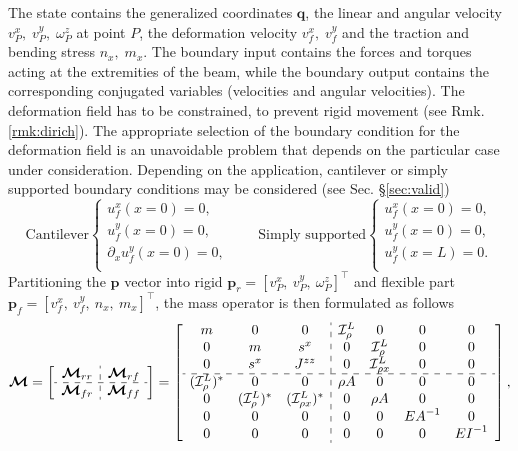 \documentclass{svjour3}                     %
\newcommand{\secref}[1]{\S\ref{#1}}
\begin{document}
The state contains the generalized coordinates $\bm{q}$, the linear and angular velocity $v_P^x, \; v_P^y, \; \omega_P^z$ at point $P$, the deformation velocity $ v_f^x, \; v_f^y$ and the traction and bending stress $n_x, \; m_{x}$. The boundary input contains the forces and torques acting at the extremities of the beam, while the boundary output contains the corresponding conjugated variables (velocities and angular velocities).
The deformation field has to be constrained, to prevent rigid movement (see Rmk. \ref{rmk:dirich}). The appropriate selection of the boundary condition for the deformation field is an unavoidable problem that depends on the particular case under consideration.  Depending on the application, cantilever or simply supported boundary conditions may be considered (see Sec. \secref{sec:valid})
\begin{equation*}
\text{Cantilever}
\begin{cases}
u_f^x(x=0) = 0, \\
u_f^y(x=0) = 0, \\
\partial_x u_f^y(x=0) = 0, \\
\end{cases} \qquad 
\text{Simply supported}
\begin{cases}
u_f^x(x=0) = 0, \\
u_f^y(x=0) = 0, \\
u_f^y(x=L) = 0. \\
\end{cases}
\end{equation*}
Partitioning the $\bm{p}$ vector into rigid $\bm{p}_r = [v_P^x, \ v_P^y, \ \omega_P^z]^\top$ and flexible part $\bm{p}_f = [v_f^x, \ v_f^y, \ n_x, \ m_{x}]^\top$, the mass operator is then formulated as follows
\begin{equation}
\label{eq:EB_M}
\bm{\mathcal{M}} = 
\left[ \begin{array}{c:c}
\bm{\mathcal{M}}_{rr} & \bm{\mathcal{M}}_{rf} \\
\hdashline
\bm{\mathcal{M}}_{fr} & \bm{\mathcal{M}}_{ff} \\
\end{array} \right] = 
\left[ \begin{array}{ccc:cccc}
m & 0 & 0 & \mathcal{I}_\rho^L & 0 & 0 & 0 \\
0 & m & s^x & 0 & \mathcal{I}_\rho^L & 0 & 0 \\
0 & s^x & J^{zz} & 0 & \mathcal{I}_{\rho x}^{L} & 0 & 0 \\
\hdashline 
(\mathcal{I}_\rho^{L})^* & 0 & 0 & \rho A & 0 & 0 & 0  \\
0 & (\mathcal{I}_\rho^{L})^* & (\mathcal{I}_{\rho x}^{L})^* & 0 & \rho A & 0 & 0  \\
0 & 0 & 0 & 0 & 0 & {EA}^{-1} & 0 \\
0 & 0 & 0 & 0 & 0 & 0 & {EI}^{-1} \\
\end{array} \right],
\end{equation}
\end{document}
